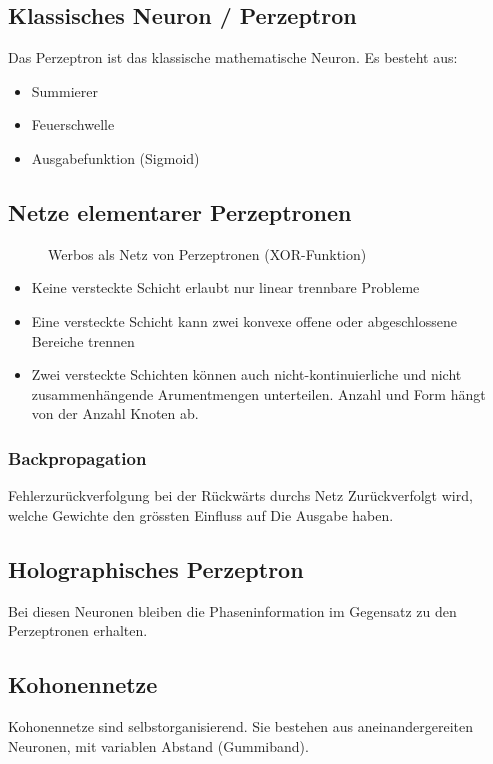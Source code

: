 \subsection{Klassisches Neuron / Perzeptron}
Das Perzeptron ist das klassische mathematische Neuron. Es besteht aus:
\begin{itemize}
	\item Summierer
	\item Feuerschwelle
	\item Ausgabefunktion (Sigmoid)
\end{itemize}

\subsection{Netze elementarer Perzeptronen}
\begin{figure}[h!]
	\centering
	
	\caption{Werbos als Netz von Perzeptronen (XOR-Funktion)}
\end{figure}
\begin{itemize}
	\item Keine versteckte Schicht erlaubt nur linear trennbare Probleme
	\item Eine versteckte Schicht kann zwei konvexe offene oder abgeschlossene Bereiche trennen
	\item Zwei versteckte Schichten können auch nicht-kontinuierliche und nicht zusammenhängende
		Arumentmengen unterteilen. Anzahl und Form hängt von der Anzahl Knoten ab.
\end{itemize}

\subsubsection{Backpropagation}
Fehlerzurückverfolgung bei der Rückwärts durchs Netz Zurückverfolgt wird,
welche Gewichte den grössten Einfluss auf Die Ausgabe haben.

\subsection{Holographisches Perzeptron}
Bei diesen Neuronen bleiben die Phaseninformation im Gegensatz zu den
Perzeptronen erhalten.

\subsection{Kohonennetze}
Kohonennetze sind selbstorganisierend. Sie bestehen aus aneinandergereiten
Neuronen, mit variablen Abstand (Gummiband).

